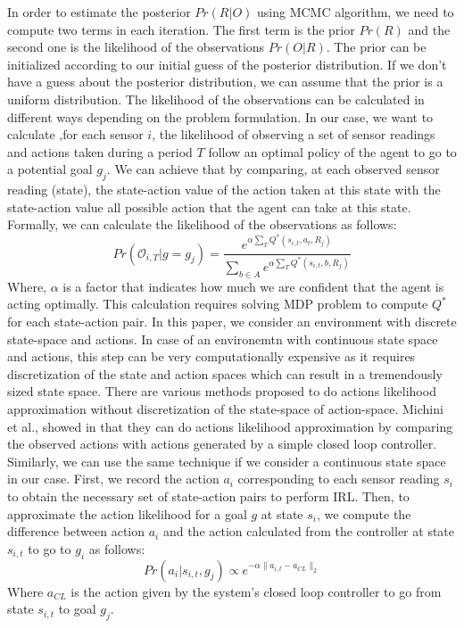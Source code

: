 \documentclass[conference]{IEEEtran}
\begin{document}
In order to estimate the posterior $Pr(R|O)$ using  MCMC algorithm, we need to compute two terms in each iteration. The first term is the prior $Pr(R)$ and the second one is the likelihood of the observations $Pr(O|R)$.
The prior can be initialized according to our initial guess of the posterior distribution. If we don't have a guess about the posterior distribution, we can assume that the prior is a uniform distribution.
The likelihood of the observations can be calculated in different ways depending on the problem formulation. In our case, we want to calculate ,for each sensor $i$, the likelihood of observing a set of sensor readings and actions taken during a period $T$ follow an optimal policy of the agent to go to a potential goal $g_j$. We can achieve that by comparing, at each observed sensor reading (state), the state-action value of the action taken at this state with the state-action value all possible action that the agent can take at this state. Formally, we can calculate the likelihood of the observations as follows:
\begin{equation}
Pr(\mathcal{O}_{i,T} | g = g_j)  = \frac{e^{\alpha\sum_{T}{Q^*(s_{i,t},a_t,R_j)}}}{\sum_{b\in A}{}e^{\alpha\sum_{T}{}Q^*(s_{i,t},b,R_j)}}
\end{equation}
Where, $\alpha$ is a factor that indicates how much we are confident that the agent is acting optimally. This calculation requires solving MDP problem to compute $Q^*$ for each state-action pair. In this paper, we consider an  environment with discrete state-space and actions. In case of an environemtn with continuous state space and actions, this step can be very computationally expensive as it requires discretization of the state and action spaces which can result in a tremendously sized state space. There are various methods proposed to do actions likelihood approximation without discretization of the state-space of action-space. Michini et al., showed in \cite{Michini2013} that they can do actions likelihood approximation by comparing the observed actions with actions generated by a simple closed loop controller. Similarly, we can use the same technique if we consider a continuous state space in our case. First, we record the action $a_i$ corresponding to each sensor reading $s_i$ to obtain the necessary set of state-action pairs to perform IRL. Then, to approximate the action likelihood for a goal $g$ at state $s_i$, we compute the difference between action $a_i$ and the action calculated from the controller at state $s_{i,t}$ to go to $g_i$ as follows:
\begin{equation}
 Pr(a_i|s_{i,t},g_j) \propto e^{-\alpha \lVert a_{i,t} - a_{CL} \rVert_{2}}
\end{equation}
Where $a_{CL}$ is the action given by the system's closed loop controller to go from state $s_{i,t}$ to goal $g_j$.
\end{document}
